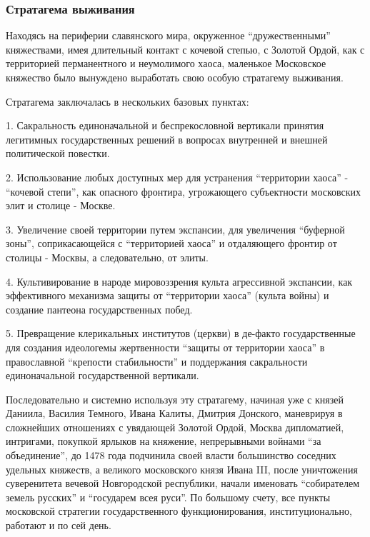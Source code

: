  
 
 
 
 

\subsubsection{Стратагема выживания}

Находясь на периферии славянского мира, окруженное \enquote{дружественными}
княжествами, имея длительный контакт с кочевой степью, с Золотой Ордой, как с
территорией перманентного и неумолимого хаоса, маленькое Московское княжество
было вынуждено выработать свою особую стратагему выживания.

Стратагема заключалась в нескольких базовых пунктах:

1. Сакральность единоначальной и беспрекословной вертикали принятия легитимных
государственных решений в вопросах внутренней и внешней политической повестки.

2. Использование любых доступных мер для устранения \enquote{территории хаоса} -
\enquote{кочевой степи}, как опасного фронтира, угрожающего субъектности московских
элит и столице - Москве.

3. Увеличение своей территории путем экспансии, для увеличения \enquote{буферной зоны},
соприкасающейся с \enquote{территорией хаоса} и отдаляющего фронтир от столицы -
Москвы, а следовательно, от элиты.

4. Культивирование в народе мировоззрения культа агрессивной экспансии, как
эффективного механизма защиты от \enquote{территории хаоса} (культа войны) и создание
пантеона государственных побед.

5. Превращение клерикальных институтов (церкви) в де-факто государственные для
создания идеологемы жертвенности \enquote{защиты от территории хаоса} в православной
\enquote{крепости стабильности} и поддержания сакральности единоначальной
государственной вертикали.

Последовательно и системно используя эту стратагему, начиная уже с князей
Даниила, Василия Темного, Ивана Калиты, Дмитрия Донского, маневрируя в
сложнейших отношениях с увядающей Золотой Ордой, Москва дипломатией, интригами,
покупкой ярлыков на княжение, непрерывными войнами \enquote{за объединение}, до 1478
года подчинила своей власти большинство соседних удельных княжеств, а великого
московского князя Ивана III, после уничтожения суверенитета вечевой
Новгородской республики, начали именовать \enquote{собирателем земель русских} и
\enquote{государем всея руси}. По большому счету, все пункты московской стратегии
государственного функционирования, институционально, работают и по сей день.


